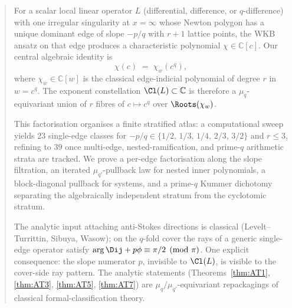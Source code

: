 \begin{abstract}
For a scalar local linear operator $L$ (differential, difference, or
$q$-difference) with one irregular singularity at $x = \infty$ whose
Newton polygon has a unique dominant edge of slope $-p/q$ with $r{+}1$
lattice points, the WKB ansatz on that edge produces a characteristic
polynomial $\chi \in \mathbb{C}[c]$. Our central algebraic identity is
\[
   \chi(c) \;=\; \chi_w(c^q),
\]
where $\chi_w \in \mathbb{C}[w]$ is the classical edge-indicial polynomial
of degree $r$ in $w = c^q$. The exponent constellation
$\Cl(L) \subset \mathbb{C}$ is therefore a $\mu_q$-equivariant union of
$r$ fibres of $c \mapsto c^q$ over $\Roots(\chi_w)$.

This factorisation organises a finite stratified atlas: a computational
sweep yields $23$ single-edge classes for
$-p/q \in \{1/2,\,1/3,\,1/4,\,2/3,\,3/2\}$ and $r \le 3$, refining to
$39$ once multi-edge, nested-ramification, and prime-$q$ arithmetic
strata are tracked. We prove a per-edge factorisation along the slope
filtration, an iterated $\mu_{q'}$-pullback law for nested inner
polynomials, a block-diagonal pullback for systems, and a prime-$q$
Kummer dichotomy separating the algebraically independent stratum from
the cyclotomic stratum.

The analytic input attaching anti-Stokes directions is classical
(Levelt--Turrittin, Sibuya, Wasow); on the $q$-fold cover the rays of a
generic single-edge operator satisfy
$\arg \Dij + p\phi \equiv \pi/2 \pmod{\pi}$. One explicit consequence:
the slope numerator $p$, invisible to $\Cl(L)$, is visible to the
cover-side ray pattern. The analytic statements
(Theorems~\ref{thm:AT1}, \ref{thm:AT3}, \ref{thm:AT5}, \ref{thm:AT7})
are $\mu_q/\mu_{q'}$-equivariant repackagings of classical
formal-classification theory.
\end{abstract}
